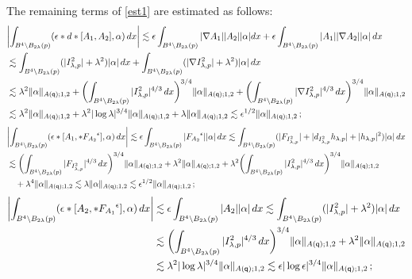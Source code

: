 \documentclass[11pt]{article}
\numberwithin{equation}{section} \setlength{\topmargin}{-35pt}
\newcommand{\q}{\mathsf{q}}
\begin{document}
The remaining terms of \eqref{est1} are estimated as follows:
\begin{align}
&\biggl|\int_{B^4\setminus B_{2\lambda}(p)}(\epsilon\ast
d\ast[A_1,A_2],\alpha)\,dx\biggr| \lesssim
\epsilon\int_{B^4\setminus B_{2\lambda}(p)}|\nabla
A_1||A_2||\alpha|dx+
\epsilon\int_{B^4\setminus B_{2\lambda}(p)}|A_1||\nabla A_2||\alpha|\,dx\notag\\
&\lesssim\int_{B^4\setminus B_{2\lambda}(p)}(|I^2_{\lambda,p}|+
\lambda^2)|\alpha|\,dx+\int_{B^4\setminus B_{2\lambda}(p)}(|\nabla I^2_{\lambda,p}|+\lambda^2)|\alpha|\,dx\notag\\
&\lesssim\lambda^2\|\alpha\|_{A(\q);1,2}+\biggl(\int_{B^4\setminus
B_{2\lambda}(p)}|I^2_{\lambda,p}|^{4/3}\,dx\biggr)^{3/4}
\|\alpha\|_{A(\q);1,2}+\biggl(\int_{B^4\setminus B_{2\lambda}(p)}|\nabla I^2_{\lambda,p}|^{4/3}\,dx\biggr)^{3/4}\|\alpha\|_{A(\q);1,2}\notag\\
&\lesssim
\lambda^2\|\alpha\|_{A(\q);1,2}+\lambda^2|\log\lambda|^{3/4}\|\alpha\|_{A(\q);1,2}+\lambda\|\alpha\|_{A(\q);1,2}
\lesssim\epsilon^{1/2}\|\alpha\|_{A(\q);1,2}\,;
\end{align}
\begin{align}
 &\biggl|\int_{B^4\setminus B_{2\lambda}(p)}(\epsilon\ast[A_1,\ast {F_{A_2}}^{\epsilon}],\alpha)\,dx\biggr|
\lesssim \epsilon\int_{B^4\setminus
B_{2\lambda}(p)}|{F_{A_2}}^{\epsilon}||\alpha|\,dx
\lesssim \int_{B^4\setminus B_{2\lambda}(p)}(|F_{I^2_{\lambda,p}}|+|d_{I^2_{\lambda,p}}h_{\lambda,p}|+|h_{\lambda,p}|^2)|\alpha|\,dx\notag\\
&\lesssim \biggl(\int_{B^4\setminus
B_{2\lambda}(p)}|F_{I^2_{\lambda,p}}|^{4/3}\,dx\biggr)^{3/4}\|\alpha\|_{A(\q);1,2}+
\lambda^2\|\alpha\|_{A(\q);1,2}+\lambda^2\biggl(\int_{B^4\setminus
B_{2\lambda}(p)}|I^2_{\lambda,p}|^{4/3}\,dx\biggr)^{3/4}\|\alpha\|_{A(\q);1,2}
\notag\\
 &\quad+\lambda^4\|\alpha\|_{A(\q);1,2}\lesssim\lambda\|\alpha\|_{A(\q);1,2}\lesssim\epsilon^{1/2}\|\alpha\|_{A(\q);1,2}\,;
\end{align}
\begin{align}
\biggl|\int_{B^4\setminus B_{2\lambda}(p)}(\epsilon\ast[A_2,\ast
{F_{A_1}}^{\epsilon}],\alpha)\,dx\biggr|&\lesssim\epsilon\int_{B^4\setminus
B_{2\lambda}(p)}|A_2||\alpha|\,dx
 \lesssim\int_{B^4\setminus B_{2\lambda}(p)}(|I^2_{\lambda,p}|+\lambda^2)|\alpha|\,dx\notag\\
 &\lesssim\biggl(\int_{B^4\setminus B_{2\lambda}(p)}|I^2_{\lambda,p}|^{4/3}\,dx\biggr)^{3/4}\|\alpha\|_{A(\q);1,2}+
 \lambda^2\|\alpha\|_{A(\q);1,2}\notag\\
 &\lesssim\lambda^2|\log\lambda|^{3/4}\|\alpha\|_{A(\q);1,2}\lesssim\epsilon|\log\epsilon|^{3/4}\|\alpha\|_{A(\q);1,2}\,;
\end{align}
\end{document}

